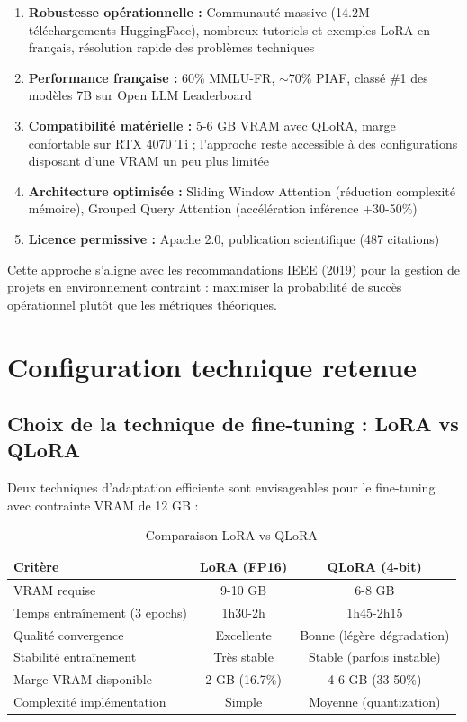 \begin{enumerate}
    \item \textbf{Robustesse opérationnelle :} Communauté massive (14.2M téléchargements HuggingFace), nombreux tutoriels et exemples LoRA en français, résolution rapide des problèmes techniques
    
    \item \textbf{Performance française :} 60\% MMLU-FR, $\sim$70\% PIAF, classé \#1 des modèles 7B sur Open LLM Leaderboard
    
    \item \textbf{Compatibilité matérielle :} 5-6 GB VRAM avec QLoRA, marge confortable sur RTX 4070 Ti ; l'approche reste accessible à des configurations disposant d'une VRAM un peu plus limitée
    
    \item \textbf{Architecture optimisée :} Sliding Window Attention (réduction complexité mémoire), Grouped Query Attention (accélération inférence +30-50\%)
    
    \item \textbf{Licence permissive :} Apache 2.0, publication scientifique (487 citations)
\end{enumerate}

Cette approche s'aligne avec les recommandations IEEE (2019) pour la gestion de projets en environnement contraint : maximiser la probabilité de succès opérationnel plutôt que les métriques théoriques.

\section{Configuration technique retenue}

\subsection{Choix de la technique de fine-tuning : LoRA vs QLoRA}

Deux techniques d'adaptation efficiente sont envisageables pour le fine-tuning avec contrainte VRAM de 12 GB :

\begin{table}[h]
\centering
\caption{Comparaison LoRA vs QLoRA}
\label{tab:lora_vs_qlora}
\begin{tabular}{@{}lcc@{}}
\toprule
\textbf{Critère} & \textbf{LoRA (FP16)} & \textbf{QLoRA (4-bit)} \\ \midrule
VRAM requise & 9-10 GB & 6-8 GB \\
Temps entraînement (3 epochs) & 1h30-2h & 1h45-2h15 \\
Qualité convergence & Excellente & Bonne (légère dégradation) \\
Stabilité entraînement & Très stable & Stable (parfois instable) \\
Marge VRAM disponible & 2 GB (16.7\%) & 4-6 GB (33-50\%) \\
Complexité implémentation & Simple & Moyenne (quantization) \\ \bottomrule
\end{tabular}
\end{table}

